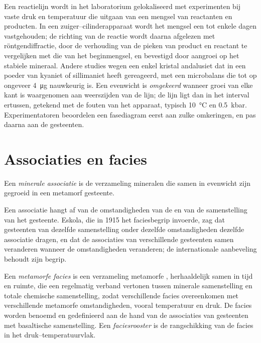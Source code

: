 \begin{inthelab}
Een reactielijn wordt in het laboratorium gelokaliseerd met experimenten bij vaste druk en
temperatuur die uitgaan van een mengsel van reactanten en producten. In een
zuiger--cilinderapparaat wordt het mengsel een tot enkele dagen vastgehouden; de richting van de reactie wordt daarna
afgelezen met röntgendiffractie, door de verhouding van de pieken van product en reactant
te vergelijken met die van het beginmengsel, en bevestigd door aangroei op het stabiele mineraal. Andere
studies wegen een enkel kristal andalusiet dat in een poeder van kyaniet of
sillimaniet heeft gereageerd, met een microbalans die tot op ongeveer \qty{4}{\micro g} nauwkeurig is. Een evenwicht is
\emph{omgekeerd} wanneer groei van elke kant is waargenomen aan weerszijden van de lijn;
de lijn ligt dan in het interval ertussen, getekend met de fouten van het apparaat,
typisch \qty{10}{\celsius} en \qty{0.5}{kbar}. Experimentatoren beoordelen een fasediagram eerst
aan zulke omkeringen, en pas daarna aan de gesteenten.
\end{inthelab}

\section{Associaties en facies}\label{sec:b2:metamorphic-facies:facies}

\begin{definition}\label{def:b2:metamorphic-facies:assemblage}
Een \emph{minerale associatie} is de verzameling mineralen die
samen in evenwicht zijn gegroeid in een metamorf gesteente.
\end{definition}

Een associatie hangt af van de omstandigheden van de  en van de samenstelling van het
gesteente. Eskola, die in 1915 het faciesbegrip invoerde, zag dat gesteenten van dezelfde
samenstelling onder dezelfde omstandigheden dezelfde associatie dragen, en dat de
associaties van verschillende gesteenten samen veranderen wanneer de omstandigheden veranderen; de
internationale aanbeveling behoudt zijn begrip.

\begin{definition}\label{def:b2:metamorphic-facies:facies}
Een \emph{metamorfe facies} is een verzameling metamorfe , herhaaldelijk samen in tijd en ruimte, die een regelmatig verband vertonen
tussen minerale samenstelling en totale chemische samenstelling, zodat verschillende facies
overeenkomen met verschillende metamorfe omstandigheden, vooral temperatuur en druk. De
facies worden benoemd en gedefinieerd aan de hand van de associaties van gesteenten met basaltische samenstelling. Een
\emph{faciesrooster} is de rangschikking van de facies in het
druk--temperatuurvlak.
\end{definition}

